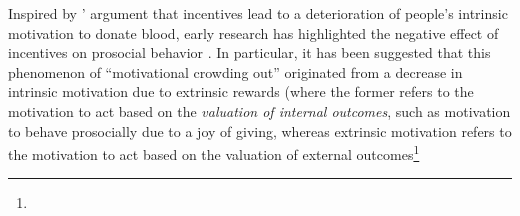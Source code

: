 \documentclass[AER]{AEA}
\begin{document}
Inspired by \citeauthor{titmuss_gift_1971}'  \citeyearpar{titmuss_gift_1971} argument that incentives lead to a deterioration of people's intrinsic motivation to donate blood, early research has highlighted the negative effect of incentives on prosocial behavior \citep{deci_effects_1971}. In particular, it has been suggested that this phenomenon of “motivational crowding out” originated from a decrease in intrinsic motivation due to extrinsic rewards (where the former refers to the motivation to act based on the \textit{valuation of internal outcomes}, such as motivation to behave prosocially due to a joy of giving, whereas extrinsic motivation refers to the motivation to act based on the valuation of external outcomes\footnote{
}
\end{document}
